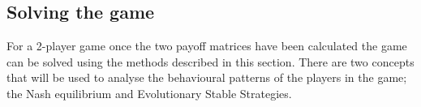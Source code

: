 \subsection{Solving the game}\label{sec:game_solving}

For a 2-player game once the two payoff matrices have been calculated
the game can be solved using the methods described in this section.
There are two concepts that will be used to analyse the behavioural patterns
of the players in the game; the Nash equilibrium and Evolutionary Stable
Strategies.
